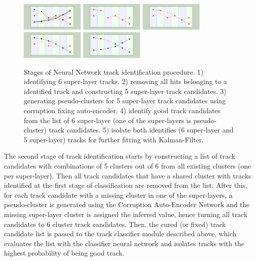  \begin{figure}[!h]
\begin{center}
 \includegraphics[angle=90,width=1.2in]{images/iden_6_sl.pdf}
  \includegraphics[angle=90,width=1.2in]{images/iden_5_sl_a.pdf}
    \includegraphics[angle=90,width=1.2in]{images/iden_5_sl_b.pdf}
      \includegraphics[angle=90,width=1.2in]{images/iden_5_sl_c.pdf}
            \includegraphics[angle=90,width=1.2in]{images/iden_5_sl_d.pdf}

\caption {Stages of Neural Network track identification procedure. 1) identifying 6 super-layer tracks. 2) removing all hits 
belonging to a identified track and constructing 5 super-layer track candidates. 3) generating pseudo-clusters for 5 super-layer
track candidates using corruption fixing auto-encoder. 4) identify good track candidates from the list of 6 super-layer 
(one of the super-layers is pseudo-cluster) track candidates. 5) isolate both identifies (6 super-layer and 5 super-layer) tracks 
for further fitting with Kalman-Filter.}
 \label{network:procedure}
 \end{center}
\end{figure}

The second stage of track identification starts by constructing a list of track candidates with combinations of 5 clusters 
out of 6 from all existing clusters (one per super-layer). Then all track candidates that have a shared cluster with tracks
identified at the first stage of classification are removed from the list. After this, for each track candidate with a missing cluster
in one of the super-layers, a pseudo-cluster is generated using the Corruption Auto-Encoder Network and the missing super-layer 
cluster is assigned the inferred value, hence turning all track candidates to 6 cluster track candidates. Then, the 
cured (or fixed) track candidate list is passed to the track classifier module described above, which evaluates the list with
the classifier neural network and isolates tracks with the highest probability of being good track. 

